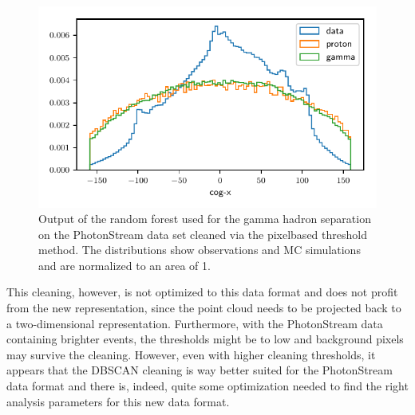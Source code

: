 \begin{figure}
  \centering
  \includegraphics[width=\textwidth, page=5]{Plots/data_mc/features_thresh.pdf}
  \caption{Output of the random forest used for the gamma hadron separation on the PhotonStream data set cleaned via the pixelbased threshold method. The distributions show observations and MC simulations and are normalized to an area of \num{1}.}
  \label{fig:threshg}
\end{figure}
%
This cleaning, however, is not optimized to this data format and does not
profit from the new representation, since the point cloud needs to be projected
back to a two-dimensional representation. Furthermore, with the PhotonStream
data containing brighter events, the thresholds might be to low and background
pixels may survive the cleaning. However, even with higher cleaning thresholds,
it appears that the DBSCAN cleaning is way better suited for the PhotonStream
data format and there is, indeed, quite some optimization needed to find the
right analysis parameters for this new data format.

